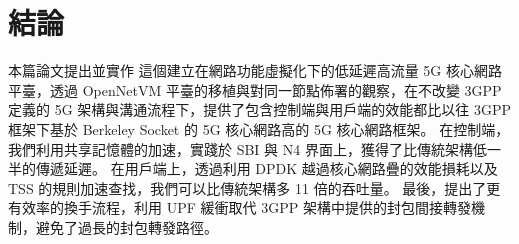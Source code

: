 \chapter{結論}
\label{chapter:conclusion}


本篇論文提出並實作 \LHCN 這個建立在網路功能虛擬化下的低延遲高流量 5G 核心網路平臺，透過 OpenNetVM 平臺的移植與對同一節點佈署的觀察，在不改變 3GPP 定義的 5G 架構與溝通流程下，提供了包含控制端與用戶端的效能都比以往 3GPP 框架下基於 Berkeley Socket 的 5G 核心網路高的 5G 核心網路框架。
在控制端，我們利用共享記憶體的加速，實踐於 SBI 與 N4 界面上，獲得了比傳統架構低一半的傳遞延遲。
在用戶端上，透過利用 DPDK 越過核心網路疊的效能損耗以及 TSS 的規則加速查找，我們可以比傳統架構多 11 倍的吞吐量。
最後，\LHCN 提出了更有效率的換手流程，利用 UPF 緩衝取代 3GPP 架構中提供的封包間接轉發機制，避免了過長的封包轉發路徑。
